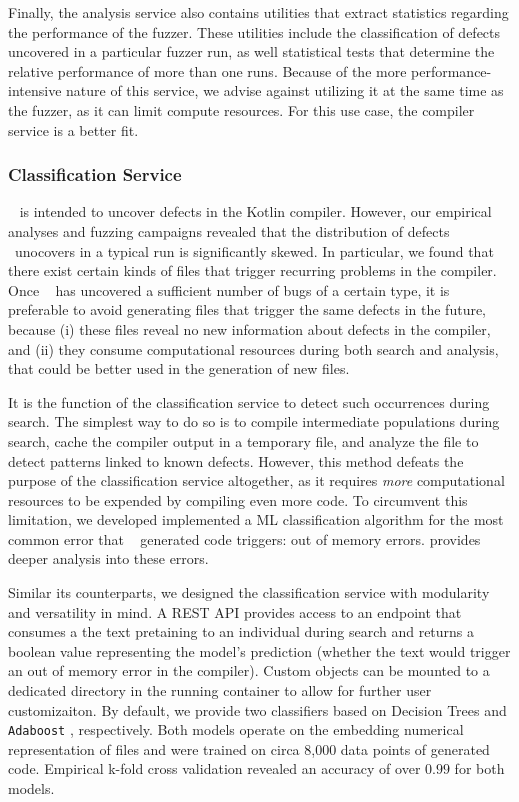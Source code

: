 Finally, the analysis service also contains utilities that
extract statistics regarding the performance of the fuzzer.
These utilities include the classification of defects uncovered
in a particular fuzzer run, as well statistical tests
that determine the relative performance of more than one runs.
Because of the more performance-intensive nature of this
service, we advise against utilizing it at the same time
as the fuzzer, as it can limit compute resources.
For this use case, the compiler service is a better fit.

\subsubsection{Classification Service}

\kf~ is intended to uncover defects in the Kotlin compiler.
However, our empirical analyses and fuzzing campaigns revealed
that the distribution of defects \kf~unocovers in a typical run
is significantly skewed.
In particular, we found that there exist certain kinds of files
that trigger recurring problems in the compiler.
Once \kf~ has uncovered a sufficient number of bugs
of a certain type, it is preferable to avoid generating
files that trigger the same defects in the future, because
(i) these files reveal no new information about 
defects in the compiler, and (ii) they consume computational resources
during both search and analysis, that could be better
used in the generation of new files.

It is the function of the classification service to
detect such occurrences during search.
The simplest way to do so is to compile
intermediate populations during search,
cache the compiler output in a temporary file,
and analyze the file to detect patterns linked to known defects.
However, this method defeats the purpose of the classification
service altogether, as it requires \textit{more} computational resources
to be expended by compiling even more code.
To circumvent this limitation, we developed implemented a \gls{ML}
classification algorithm for the most common error that \kf~ generated code
triggers: out of memory errors.
 provides deeper analysis into these errors.

Similar its counterparts, we designed the classification service
with modularity and versatility in mind.
A REST API provides access to an endpoint that consumes a
the text pretaining to an individual during search and returns
a boolean value representing the model's prediction (whether the text
would trigger an out of memory error in the compiler).
Custom objects can be mounted to a dedicated directory in the running
container to allow for further user customizaiton.
By default, we provide two classifiers based on Decision Trees
and \texttt{Adaboost} \cite{freund1997decision}, respectively.
Both models operate on the embedding numerical representation
of files and were trained on circa 8,000 data points of generated code.
Empirical k-fold cross validation revealed an accuracy of over $0.99$ for both models.

